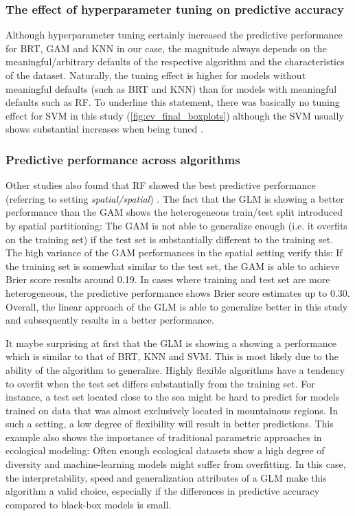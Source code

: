 \documentclass[review]{elsarticle}
\begin{document}
\subsubsection{The effect of hyperparameter tuning on predictive accuracy}
Although hyperparameter tuning certainly increased the predictive performance for BRT, GAM and KNN in our case, the magnitude always depends on the meaningful/arbitrary defaults of the respective algorithm and the characteristics of the dataset.
Naturally, the tuning effect is higher for models without meaningful defaults (such as BRT and KNN) than for models with meaningful defaults such as RF.
To underline this statement, there was basically no tuning effect for SVM in this study (\autoref{fig:cv_final_boxplots}) although the SVM usually shows substantial increases when being tuned \citep{Rojas_Dominguez2018}.

\subsubsection{Predictive performance across algorithms}
Other studies also found that RF showed the best predictive performance (referring to setting \emph{spatial/spatial}) \citep{Bahn2012, Jarnevich2017, Smolinski2016, Vorpahl2012}.
The fact that the GLM is showing a better performance than the GAM shows the heterogeneous train/test split introduced by spatial partitioning: The GAM is not able to generalize enough (i.e. it overfits on the training set) if the test set is substantially different to the training set.
The high variance of the GAM performances in the spatial setting verify this: If the training set is somewhat similar to the test set, the GAM is able to achieve Brier score results around 0.19.
In cases where training and test set are more heterogeneous, the predictive performance shows Brier score estimates up to 0.30.
Overall, the linear approach of the GLM is able to generalize better in this study and subsequently results in a better performance.

It maybe surprising at first that the GLM is showing a showing a performance which is similar to that of BRT, KNN and SVM.
This is most likely due to the ability of the algorithm to generalize.
Highly flexible algorithms have a tendency to overfit when the test set differs substantially from the training set.
For instance, a test set located close to the sea might be hard to predict for models trained on data that was almost exclusively located in mountainous regions.
In such a setting, a low degree of flexibility will result in better predictions.
This example also shows the importance of traditional parametric approaches in ecological modeling: Often enough ecological datasets show a high degree of diversity and machine-learning models might suffer from overfitting.
In this case, the interpretability, speed and generalization attributes of a GLM make this algorithm a valid choice, especially if the differences in predictive accuracy compared to black-box models is small.
\end{document}
